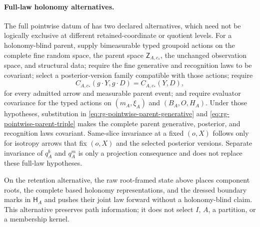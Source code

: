 \paragraph{Full-law holonomy alternatives.}
The full pointwise datum of  has two declared alternatives,
which need not be logically exclusive at different retained-coordinate or quotient levels. For a
holonomy-blind parent, supply bimeasurable typed groupoid actions on the complete fine random space,
the parent space $\mathsf Z_{A,c_*}$, the unchanged observation space, and structural data; require the
fine generative and recognition laws to be covariant; select a posterior-version family compatible
with those actions; require
\begin{equation}
C_{A,c_*}(g\mathbin{\cdot}Y,g\mathbin{\cdot}D)=C_{A,c_*}(Y,D),
\label{eq:rg-pointwise-parent-holonomy-channel}
\end{equation}
for every admitted arrow and measurable parent event; and require evaluator covariance for the
typed actions on $(m_A,\xi_A)$ and $(B_A,O,H_A)$. Under those hypotheses, substitution in
\eqref{eq:rg-pointwise-parent-generative} and
\eqref{eq:rg-pointwise-parent-triple} makes the complete parent generative, posterior, and
recognition laws covariant. Same-slice invariance at a fixed $(o,X)$ follows only for isotropy arrows
that fix $(o,X)$ and the selected posterior versions. Separate invariance of $q_A^b$ and $q_A^m$ is
only a projection consequence and does not replace these full-law hypotheses.

On the retention alternative, the raw root-framed state above places component roots, the complete
based holonomy representations, and the dressed boundary marks in $\mathsf H_A$ and pushes their
joint law forward without a holonomy-blind claim. This alternative preserves path information; it
does not select $I$, $A$, a partition, or a membership kernel. 

